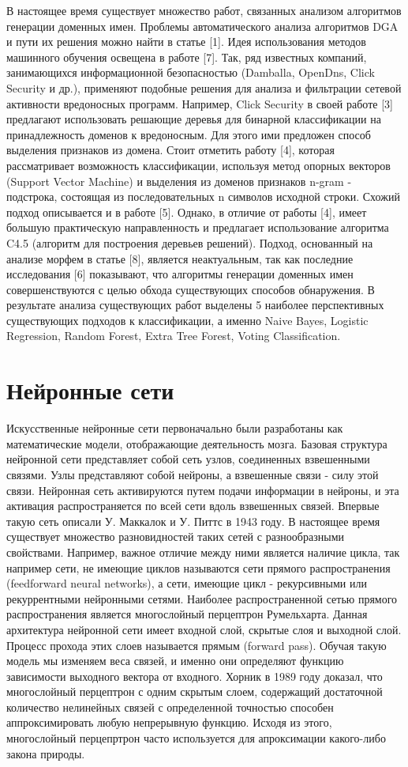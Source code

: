 В настоящее время существует множество работ, связанных анализом алгоритмов генерации доменных имен. Проблемы автоматического анализа алгоритмов DGA и пути их решения можно найти в статье [1]. Идея использования методов машинного обучения освещена в работе [7]. Так, ряд известных компаний, занимающихся информационной безопасностью (Damballa, OpenDns, Click Security и др.), применяют подобные решения для анализа и фильтрации сетевой активности вредоносных программ. Например, Click Security в своей работе [3] предлагают использовать решающие деревья для бинарной классификации на принадлежность доменов к вредоносным. Для этого ими предложен способ выделения признаков из домена. Стоит отметить работу [4], которая рассматривает возможность классификации, используя метод опорных векторов (Support Vector Machine) и выделения из доменов признаков n-gram - подстрока, состоящая из последовательных n символов исходной строки. Схожий подход описывается и в работе [5]. Однако, в отличие от работы [4], имеет большую практическую направленность и предлагает использование алгоритма C4.5 (алгоритм для построения деревьев решений). Подход, основанный на анализе морфем в статье [8], является неактуальным, так как последние исследования [6] показывают, что алгоритмы генерации доменных имен совершенствуются с целью обхода существующих способов обнаружения. В результате анализа существующих работ выделены 5 наиболее перспективных существующих подходов к классификации, а именно Naive Bayes, Logistic Regression, Random Forest, Extra Tree Forest, Voting Classification.
\clearpage

\section{Нейронные сети}\label{ner_nextwork}
    Искусственные нейронные сети первоначально были разработаны как математические модели, отображающие деятельность мозга. Базовая структура нейронной сети представляет собой сеть узлов, соединенных взвешенными связями. Узлы представляют собой нейроны, а взвешенные связи - силу этой связи. Нейронная сеть активируются путем подачи информации в нейроны, и эта активация распространяется по всей сети вдоль взвешенных связей. Впервые такую сеть описали У. Маккалок и У. Питтс в 1943 году. В настоящее время существует множество разновидностей таких сетей с разнообразными свойствами. Например, важное отличие между ними является наличие цикла, так например сети, не имеющие циклов называются сети прямого распространения (feedforward neural networks), а сети, имеющие цикл - рекурсивными или рекуррентными нейронными сетями. Наиболее распространенной сетью прямого распространения является многослойный перцептрон Румельхарта. Данная архитектура нейронной сети имеет входной слой, скрытые слоя и выходной слой. Процесс прохода этих слоев называется прямым (forward pass). Обучая такую модель мы изменяем веса связей, и именно они определяют функцию зависимости выходного вектора от входного. Хорник в 1989 году доказал, что многослойный перцептрон с одним скрытым слоем, содержащий достаточной количество нелинейных связей с определенной точностью способен аппроксимировать любую непрерывную функцию. Исходя из этого, многослойный перцепртрон часто используется для апроксимации какого-либо закона природы.
    
